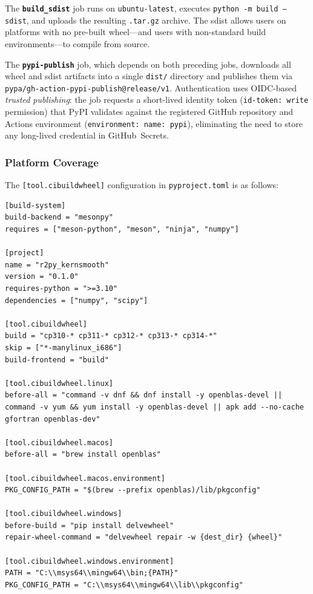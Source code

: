 \documentclass[12pt,a4paper]{article}
\begin{document}
The \textbf{\texttt{build\_sdist}} job runs on \texttt{ubuntu-latest}, executes \texttt{python~-m~build~--sdist}, and uploads the resulting \texttt{.tar.gz} archive. The sdist allows users on platforms with no pre-built wheel---and users with non-standard build environments---to compile from source.

The \textbf{\texttt{pypi-publish}} job, which depends on both preceding jobs, downloads all wheel and sdist artifacts into a single \texttt{dist/} directory and publishes them via \texttt{pypa/gh-action-pypi-publish@release/v1}. Authentication uses OIDC-based \emph{trusted publishing}: the job requests a short-lived identity token (\texttt{id-token:~write} permission) that PyPI validates against the registered GitHub repository and Actions environment (\texttt{environment:~name:~pypi}), eliminating the need to store any long-lived credential in GitHub~Secrets.

\subsubsection{Platform Coverage}
\label{sec:phase2-cibw-config}

The \texttt{[tool.cibuildwheel]} configuration in \texttt{pyproject.toml} is as follows:

\begin{lstlisting}[style=shell]
[build-system]
build-backend = "mesonpy"
requires = ["meson-python", "meson", "ninja", "numpy"]

[project]
name = "r2py_kernsmooth"
version = "0.1.0"
requires-python = ">=3.10"
dependencies = ["numpy", "scipy"]

[tool.cibuildwheel]
build = "cp310-* cp311-* cp312-* cp313-* cp314-*"
skip = ["*-manylinux_i686"]
build-frontend = "build"

[tool.cibuildwheel.linux]
before-all = "command -v dnf && dnf install -y openblas-devel || command -v yum && yum install -y openblas-devel || apk add --no-cache gfortran openblas-dev"

[tool.cibuildwheel.macos]
before-all = "brew install openblas"

[tool.cibuildwheel.macos.environment]
PKG_CONFIG_PATH = "$(brew --prefix openblas)/lib/pkgconfig"

[tool.cibuildwheel.windows]
before-build = "pip install delvewheel"
repair-wheel-command = "delvewheel repair -w {dest_dir} {wheel}"

[tool.cibuildwheel.windows.environment]
PATH = "C:\\msys64\\mingw64\\bin;{PATH}"
PKG_CONFIG_PATH = "C:\\msys64\\mingw64\\lib\\pkgconfig"
\end{lstlisting}
\end{document}
